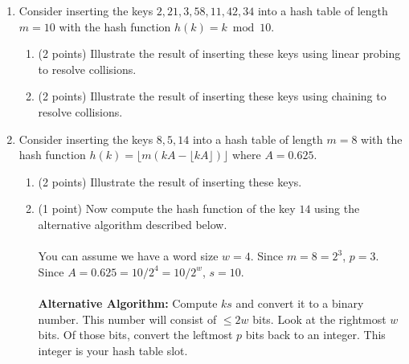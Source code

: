 \documentclass[12pt]{elsart}
\begin{document}
\begin{enumerate}
   \item Consider inserting the keys $2, 21, 3, 58, 11, 42, 34$ into a hash
table of length $m = 10$ with the hash function $h(k) = k \bmod 10$.
\begin{enumerate}
   \item (2 points)  Illustrate the result of inserting these keys using linear probing to resolve collisions.
   \item (2 points) Illustrate the result of inserting these keys using chaining to resolve collisions.
\end{enumerate}

   \item Consider inserting the keys $8,5,14$ into a hash
table of length $m = 8$ with the hash function $h(k) = \lfloor m(kA - \lfloor kA\rfloor)\rfloor$ where $A=0.625$.
\begin{enumerate}
   \item (2 points) Illustrate the result of inserting these keys.
   \item (1 point) Now compute the hash function of the key $14$ using the alternative algorithm described below.  
\\\\You can assume we have a word size $w=4$. Since $m=8=2^3$, $p=3$.  Since $A=0.625=10/2^4=10/2^w$, $s=10$.
\\\\{\bf Alternative Algorithm:} Compute $ks$ and convert it to a binary number.  This number will consist of $\leq 2w$ bits.  Look at the rightmost $w$ bits.  Of those bits, convert the leftmost $p$ bits back to an integer.  This integer is your hash table slot.\\
\end{enumerate}



\end{enumerate}
\end{document}
